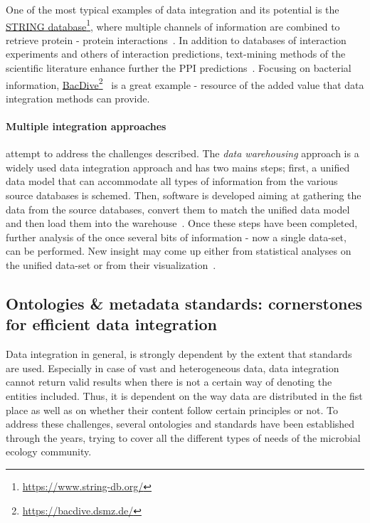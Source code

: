       One of the most typical examples of data integration and its potential
      is the \href{https://www.string-db.org/}{STRING database}\footnote{\href{https://www.string-db.org/}{https://www.string-db.org/}}, where multiple channels of information are combined 
      to retrieve protein - protein interactions~\cite{mering2003string, szklarczyk2021string}. 
      In addition to databases of interaction experiments and others of interaction predictions, text-mining methods of the scientific literature enhance further the 
      PPI predictions~\cite{szklarczyk2021string}.
      Focusing on bacterial information, \href{https://bacdive.dsmz.de/}{BacDive}\footnote{\href{https://bacdive.dsmz.de/}{https://bacdive.dsmz.de/}}~\cite{reimer2019bac}
      is a great example - resource of the added value that data integration methods can provide. 

      \paragraph{Multiple integration approaches} attempt to address the challenges described. 
      The \textit{data warehousing} approach is a widely used data integration approach and has two mains steps; 
      first, a unified data model that can accommodate all types of  
      information from the various source databases is schemed.
      Then, software is developed aiming at  
      gathering the data from the source databases, 
      convert them to match the unified data model and 
      then load them into the warehouse~\cite{stein2003integrating}.
      Once these steps have been completed, further analysis of the once
      several bits of information - now a single data-set, can be performed.
      New insight may come up either from statistical analyses on the unified
      data-set or from their visualization~\cite{leonelli2013integrating}.  

   \subsection{Ontologies \& metadata standards: cornerstones for efficient data integration}
   \label{subsec:metadata_intro}
      Data integration in general, 
      is strongly dependent by the extent that standards are used. 
      Especially in case of vast and heterogeneous data, 
      data integration cannot return valid results 
      when there is not a certain way
      of denoting the entities included.
      Thus, it is dependent on the way data are distributed in the fist place 
      as well as on whether their content follow certain principles or not. 
      To address these challenges, several ontologies and standards have 
      been established through the years, trying to cover all the different 
      types of needs of the microbial ecology community. 

